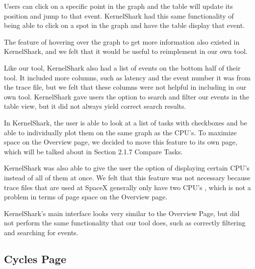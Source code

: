 \documentclass{hmcclinic}
\begin{document}
    Users can click on a specific point in the graph and the table will update its position and jump to that event. KernelShark had this same functionality of being able to click on a spot in the graph and have the table display that event. %
    
   The feature of hovering over the graph to get more information also existed in KernelShark, and we felt that it would be useful to reimplement in our own tool.

     Like our tool, KernelShark also had a list of events on the bottom half of their tool. It included more columns, such as latency and the event number it was from the trace file, but we felt that these columns were not helpful in including in our own tool. KernelShark gave users the option to search and filter our events in the table view, but it did not always yield correct search results. 
    
    In KernelShark, the user is able to look at a list of tasks with checkboxes and be able to individually plot them on the same graph as the CPU's. To maximize space on the Overview page, we decided to move this feature to its own page, which will be talked about in Section 2.1.7 Compare Tasks. 
    
    KernelShark was also able to give the user the option of displaying certain CPU's instead of all of them at once. We felt that this feature was not necessary because trace files that are used at SpaceX generally only have two CPU's , which is not a problem in terms of page space on the Overview page.
    
    KernelShark's main interface looks very similar to the Overview Page, but did not perform the same functionality that our tool does, such as correctly filtering and searching for events.

    
  \subsection{Cycles Page} %
\end{document}
